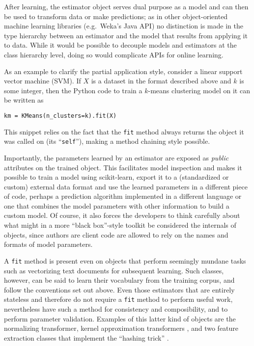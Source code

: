 \documentclass[a4paper,twocolumn]{article}
\begin{document}
After learning, the estimator object serves dual purpose as a model
and can then be used to transform data or make predictions;
as in other object-oriented machine learning libraries
(e.g.\ Weka's Java API)
no distinction is made in the type hierarchy
between an estimator and the model that results from applying it to data.
While it would be possible to decouple models and estimators
at the class hierarchy level,
doing so would complicate APIs for online learning.

As an example to clarify the partial application style,
consider a linear support vector machine (SVM).
If $X$ is a dataset in the format described above and $k$ is some integer,
then the Python code to train a $k$-means clustering model on it
can be written as
\begin{verbatim}
km = KMeans(n_clusters=k).fit(X)
\end{verbatim}
This snippet relies on the fact that the \texttt{fit} method
always returns the object it was called on (its ``\texttt{self}''),
making a method chaining style possible.

Importantly, the parameters learned by an estimator
are exposed as \textit{public} attributes on the trained object.
This facilitates model inspection
and makes it possible to train a model using scikit-learn,
export it to a (standardized or custom) external data format
and use the learned parameters in a different piece of code,
perhaps a prediction algorithm implemented in a different language
or one that combines the model parameters with other information
to build a custom model.
Of course, it also forces the developers to think carefully
about what might in a more ``black box''-style toolkit
be considered the internals of objects,
since authors are client code are allowed to rely
on the names and formats of model parameters.

A \texttt{fit} method is present even on objects
that perform seemingly mundane tasks such as vectorizing text documents
for subsequent learning.
Such classes, however, can be said to learn their vocabulary
from the training corpus,
and follow the conventions set out above.
Even those estimators that are entirely stateless and therefore
do not require a \texttt{fit} method to perform useful work,
nevertheless have such a method for consistency and composibility,
and to perform parameter validation.
Examples of this latter kind of objects are the normalizing transformer,
kernel approximation transformers
\citep{rahimi2007random, li2010random, vedaldi2010efficient},
and two feature extraction classes that implement the ``hashing trick''
\citep{weinberger2009}.
\end{document}
